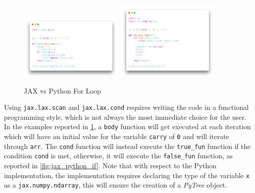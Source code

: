 \begin{figure}[h]
    \centering
    \caption{JAX vs Python For Loop}
    \label{fig:jax_python_forloop}
    \includegraphics[width=0.45\textwidth]{Images/python_forloop.png}
    \includegraphics[width=0.45\textwidth]{Images/jax_forloop.png}
\end{figure}

Using \texttt{jax.lax.scan} and \texttt{jax.lax.cond} requires writing the code in a functional programming style, which is not always the most immediate choice for the user. In the examples reported in \cref{fig:jax_python_forloop}, a \texttt{body} function will get executed at each iteration which will have an initial value for the variable \texttt{carry} of \texttt{0} and will iterate through \texttt{arr}. The \texttt{cond} function will instead execute the \texttt{true\_fun} function if the condition \texttt{cond} is met, otherwise, it will execute the \texttt{false\_fun} function, as reported in \cref{fig:jax_python_if}. Note that with respect to the Python implementation, the \jax implementation requires declaring the type of the variable \texttt{x} as a \texttt{jax.numpy.ndarray}, this will ensure the creation of a \textit{PyTree} object.

